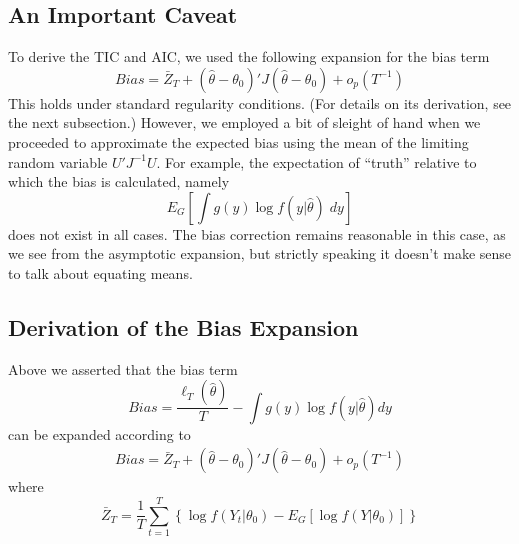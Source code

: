 \documentclass[12pt]{article}
\theoremstyle{definition}
\begin{document}
\subsection{An Important Caveat}
To derive the TIC and AIC, we used the following expansion for the bias term
$$Bias = \bar{Z}_T + (\widehat{\theta} - \theta_0)' J (\widehat{\theta} - \theta_0) + o_p(T^{-1})$$
This holds under standard regularity conditions.
(For details on its derivation, see the next subsection.) However, we employed a bit of sleight of hand when we proceeded to approximate the expected bias using the mean of the limiting random variable $U'J^{-1}U$. For example, the expectation of ``truth'' relative to which the bias is calculated, namely
$$E_G\left[\int g(y) \log f(y|\widehat{\theta})\; dy\right]$$
does not exist in all cases. The bias correction remains reasonable in this case, as we see from the asymptotic expansion, but strictly speaking it doesn't make sense to talk about equating means.

\subsection{Derivation of the Bias Expansion}
Above we asserted that the bias term
$$Bias = \frac{\ell_T(\widehat{\theta})}{T} - \int g(y) \log f(y|\widehat{\theta}) dy$$
can be expanded according to
\begin{eqnarray*}
Bias = \bar{Z}_T + (\widehat{\theta} - \theta_0)' J (\widehat{\theta} - \theta_0) + o_p(T^{-1})
\end{eqnarray*}
where
$$\bar{Z}_T = \frac{1}{T} \sum_{t=1}^T\left\{ \log f(Y_t|\theta_0) - E_G[\log f(Y|\theta_0)] \right\}$$
\end{document}
